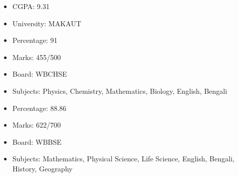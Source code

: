 \documentclass[10pt,legalpaper,ragged2e,withhyper]{debjitpalcv}
\begin{document}
\begin{paracol}{2}
    \begin{minipage}[t]{0.2\textwidth}
        \begin{itemize}
            \item CGPA: 9.31
        \end{itemize}
    \end{minipage}
    \begin{minipage}[t]{0.4\textwidth}
        \begin{itemize}
            \item University: MAKAUT
        \end{itemize}
    \end{minipage}
    \divider

    \begin{minipage}[t]{0.2\textwidth}
        \begin{itemize}
            \item Percentage: 91
            \item Marks: 455/500
        \end{itemize}
    \end{minipage}
    \begin{minipage}[t]{0.4\textwidth}
        \begin{itemize}
            \item Board: WBCHSE
            \item Subjects: Physics, Chemistry, Mathematics, Biology, English, Bengali
        \end{itemize}
    \end{minipage}

    \divider
    \begin{minipage}[t]{0.2\textwidth}
        \begin{itemize}
            \item Percentage: 88.86
            \item Marks: 622/700
        \end{itemize}
    \end{minipage}
    \begin{minipage}[t]{0.4\textwidth}
        \begin{itemize}
            \item Board: WBBSE
            \item Subjects: Mathematics, Physical Science, Life Science, English, Bengali, History, Geography
        \end{itemize}
    \end{minipage}


\end{paracol}
\end{document}
